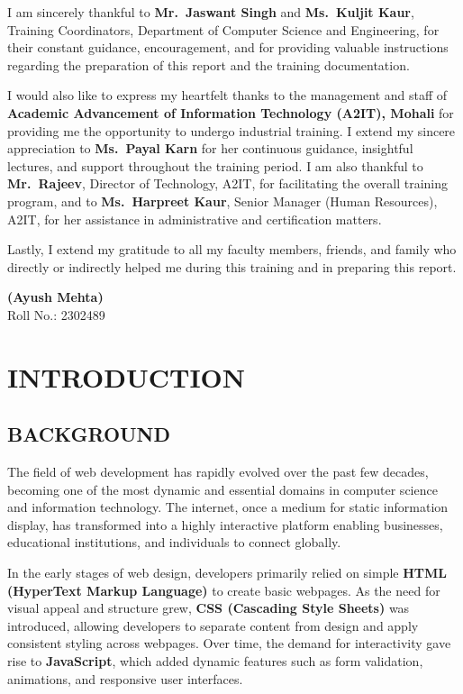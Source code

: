 \documentclass[a4paper,12pt,oneside]{report}
\numberwithin{equation}{chapter}
\numberwithin{figure}{chapter}
\numberwithin{table}{chapter}
\begin{document}
I am sincerely thankful to \textbf{Mr.~Jaswant Singh} and \textbf{Ms.~Kuljit Kaur}, Training Coordinators, Department of Computer Science and Engineering, for their constant guidance, encouragement, and for providing valuable instructions regarding the preparation of this report and the training documentation.

I would also like to express my heartfelt thanks to the management and staff of \textbf{Academic Advancement of Information Technology (A2IT), Mohali} for providing me the opportunity to undergo industrial training. I extend my sincere appreciation to \textbf{Ms.~Payal Karn} for her continuous guidance, insightful lectures, and support throughout the training period. I am also thankful to \textbf{Mr.~Rajeev}, Director of Technology, A2IT, for facilitating the overall training program, and to \textbf{Ms.~Harpreet Kaur}, Senior Manager (Human Resources), A2IT, for her assistance in administrative and certification matters.

Lastly, I extend my gratitude to all my faculty members, friends, and family who directly or indirectly helped me during this training and in preparing this report.

\vspace{10mm}
\noindent
\textbf{(Ayush Mehta)}\\
Roll No.: 2302489

\tableofcontents
\listoffigures
\listoftables

\newpage
\chapter{INTRODUCTION}

\section{BACKGROUND}

The field of web development has rapidly evolved over the past few decades, becoming one of the most dynamic and essential domains in computer science and information technology. The internet, once a medium for static information display, has transformed into a highly interactive platform enabling businesses, educational institutions, and individuals to connect globally.

In the early stages of web design, developers primarily relied on simple \textbf{HTML (HyperText Markup Language)} to create basic webpages. As the need for visual appeal and structure grew, \textbf{CSS (Cascading Style Sheets)} was introduced, allowing developers to separate content from design and apply consistent styling across webpages. Over time, the demand for interactivity gave rise to \textbf{JavaScript}, which added dynamic features such as form validation, animations, and responsive user interfaces.
\end{document}
